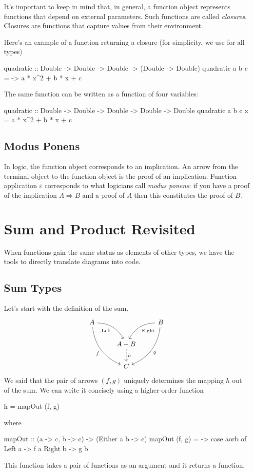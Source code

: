 \documentclass[DaoFP]{subfiles}
\begin{document}
It's important to keep in mind that, in general, a function object represents functions that depend on external parameters. Such functions are called \emph{closures}. Closures are functions that capture values from their environment.

Here's an example of a function returning a closure (for simplicity, we use  for all types)
\begin{haskell}
quadratic :: Double -> Double -> Double -> (Double -> Double)
quadratic a b c = \x -> a * x^2 + b * x + c
\end{haskell}
The same function can be written as a function of four variables:
\begin{haskell}
quadratic :: Double -> Double -> Double -> Double -> Double
quadratic a b c x = a * x^2 + b * x + c
\end{haskell}


\subsection{Modus Ponens}

In logic, the function object corresponds to an implication. An arrow from the terminal object to the function object is the proof of an implication. Function application $\varepsilon$ corresponds to what logicians call \emph{modus ponens}: if you have a proof of the implication $A \Rightarrow B$ and a proof of $A$ then this constitutes the proof of $B$.

\section{Sum and Product Revisited}

When functions gain the same status as elements of other types, we have the tools to directly translate diagrams into code. 

\subsection{Sum Types}

Let's start with the definition of the sum.
\[
 \begin{tikzcd}
 A
 \arrow[dr,  bend left, "\text{Left}"']
 \arrow[ddr, bend right, "f"']
 && B
 \arrow[dl, bend right, "\text{Right}"]
 \arrow[ddl, bend left, "g"]
 \\
&A + B
\arrow[d, dashed, "h"]
\\
& C
 \end{tikzcd}
\]
We said that the pair of arrows $(f, g)$ uniquely determines the mapping $h$ out of the sum. We can write it concisely using a higher-order function
\begin{haskell}
h = mapOut (f, g)
\end{haskell}
where
\begin{haskell}
mapOut :: (a -> c, b -> c) -> (Either a b -> c)
mapOut (f, g) = \aorb -> case aorb of
                         Left  a -> f a
                         Right b -> g b
\end{haskell}
This function takes a pair of functions as an argument and it returns a function. 
\end{document}
